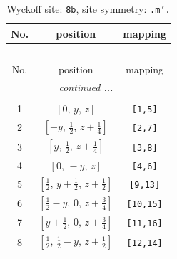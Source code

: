\documentclass[fleqn,8pt]{jsarticle}
\begin{document}
\begin{longtable}{ccc}
\caption{Wyckoff site: {\tt 8b}, site symmetry: {\tt .m'.}}
 \\
 \hline \hline
No. & position & mapping \\ \hline \endfirsthead

\multicolumn{2}{l}{\tablename\ \thetable{}} \\
 \hline \hline
No. & position & mapping \\ \hline \endhead

 \hline \hline
\multicolumn{2}{r}{\footnotesize\it continued ...} \\ \endfoot

 \hline \hline
\multicolumn{2}{r}{} \\ \endlastfoot

1 & $\left[ 0,\, y,\, z \right]$ & {\tt [1,5]} \\ \hline
2 & $\left[ - y,\, \frac{1}{2},\, z + \frac{1}{4} \right]$ & {\tt [2,7]} \\ \hline
3 & $\left[ y,\, \frac{1}{2},\, z + \frac{1}{4} \right]$ & {\tt [3,8]} \\ \hline
4 & $\left[ 0,\, - y,\, z \right]$ & {\tt [4,6]} \\ \hline
5 & $\left[ \frac{1}{2},\, y + \frac{1}{2},\, z + \frac{1}{2} \right]$ & {\tt [9,13]} \\ \hline
6 & $\left[ \frac{1}{2} - y,\, 0,\, z + \frac{3}{4} \right]$ & {\tt [10,15]} \\ \hline
7 & $\left[ y + \frac{1}{2},\, 0,\, z + \frac{3}{4} \right]$ & {\tt [11,16]} \\ \hline
8 & $\left[ \frac{1}{2},\, \frac{1}{2} - y,\, z + \frac{1}{2} \right]$ & {\tt [12,14]} \\
\end{longtable}
\renewcommand{\arraystretch}{1.2}
\end{document}

